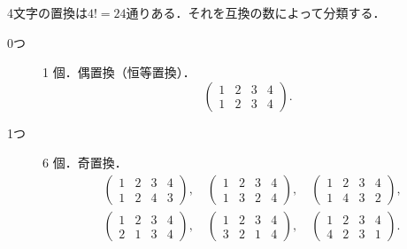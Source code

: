 \begin{tanswer}
  4文字の置換は$4!=24$通りある．それを互換の数によって分類する．
  \begin{description}
    \item[0つ] 1 個．偶置換（恒等置換）．
          \[
            \begin{pmatrix} 1 & 2 & 3 & 4 \\ 1 & 2 & 3 & 4 \end{pmatrix}.
          \]
    \item[1つ] 6 個．奇置換．
          \begin{align*}
             & \begin{pmatrix} 1 & 2 & 3 & 4 \\ 1 & 2 & 4 & 3 \end{pmatrix},\quad
            \begin{pmatrix} 1 & 2 & 3 & 4 \\ 1 & 3 & 2 & 4 \end{pmatrix},\quad
            \begin{pmatrix} 1 & 2 & 3 & 4 \\ 1 & 4 & 3 & 2 \end{pmatrix},         \\
             & \begin{pmatrix} 1 & 2 & 3 & 4 \\ 2 & 1 & 3 & 4 \end{pmatrix},\quad
            \begin{pmatrix} 1 & 2 & 3 & 4 \\ 3 & 2 & 1 & 4 \end{pmatrix},\quad
            \begin{pmatrix} 1 & 2 & 3 & 4 \\ 4 & 2 & 3 & 1 \end{pmatrix}.
          \end{align*}


\end{description}
\end{tanswer}
